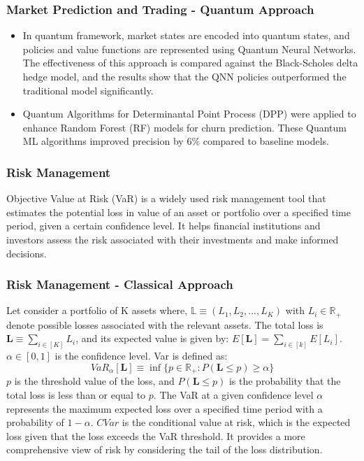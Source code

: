 \documentclass{beamer}
\begin{document}
\begin{frame}
	\frametitle{Market Prediction and Trading - Quantum Approach}
	\begin{itemize}
		\item In quantum framework, market states are encoded into quantum states, and policies and value functions are represented using Quantum Neural Networks. The effectiveness of this approach
	is compared against the Black-Scholes delta hedge model, and the results show that the QNN policies outperformed the traditional model significantly. 
		\item Quantum Algorithms for Determinantal Point Process (DPP) were applied to enhance Random Forest (RF) models for churn prediction. These Quantum ML algorithms improved precision by 6\% compared to baseline models. 
	\end{itemize}
	

\end{frame}
\begin{frame}
	\frametitle{Risk Management}
		\begin{block}{Objective}
			Value at Risk (VaR) is a widely used risk management tool that estimates the potential loss in value of an asset or portfolio over a specified time period, given a certain confidence level. It helps financial institutions and investors assess the risk associated with their investments and make informed decisions.
		\end{block}
\end{frame}
\begin{frame}
	\frametitle{Risk Management - Classical Approach}
	Let consider a portfolio of K assets where, \(\mathbb{L} \equiv (L_1, L_2, ..., L_K) \) with \(L_i \in \mathbb{R}_+\) denote possible losses associated with the relevant assets.
	The total loss is \(\mathbf{L} \equiv \sum_{i\in[K]}L_i\), and its expected value is given by: \(E[\mathbf{L}] = \sum_{i \in [k]} E[L_i]\). \(\alpha \in [0,1]\) is the confidence level. Var is defined as:
	\begin{equation}
		VaR_\alpha[\mathbf{L}] \equiv \inf\{p \in \mathbb{R}_+ : P(\mathbf{L} \leq p) \geq \alpha\}
	\end{equation}
	\(p\) is the threshold value of the loss, and \(P(\mathbf{L} \leq p)\) is the probability that the total loss is less than or equal to \(p\). The VaR at a given confidence level \(\alpha\) represents the maximum expected loss over a specified time period with a probability of \(1 - \alpha\).
	\(CVar\) is the conditional value at risk, which is the expected loss given that the loss exceeds the VaR threshold. It provides a more comprehensive view of risk by considering the tail of the loss distribution.
	

\end{frame}
\end{document}
